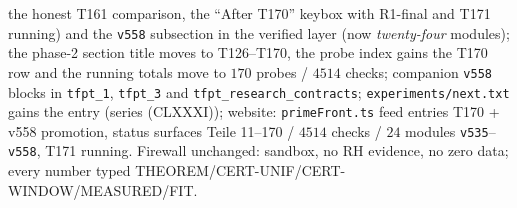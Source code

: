 \documentclass[11pt]{article}
\begin{document}
\begin{itemize}[leftmargin=1.5em]
the honest T161 comparison, the ``After T170'' keybox with R1-final and T171 running)
and the \texttt{v558} subsection in the verified layer (now \emph{twenty-four}
modules); the phase-2 section title moves to T126--T170, the probe index gains the
T170 row and the running totals move to $170$ probes / $4514$ checks; companion
\texttt{v558} blocks in \texttt{tfpt\_1}, \texttt{tfpt\_3} and
\texttt{tfpt\_research\_contracts}; \texttt{experiments/next.txt} gains the entry
(series (CLXXXI)); website: \texttt{primeFront.ts} feed entries T170 + v558
promotion, status surfaces Teile 11--170 / $4514$ checks / $24$ modules
\texttt{v535}--\texttt{v558}, T171 running. Firewall unchanged: sandbox, no RH
evidence, no zero data; every number typed
THEOREM/CERT-UNIF/CERT-WINDOW/MEASURED/FIT.
\end{itemize}
\end{document}
